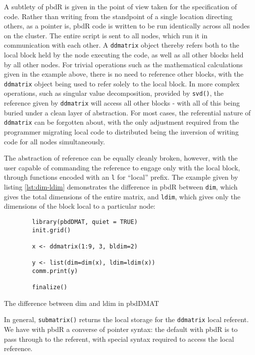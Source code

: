 A subtlety of pbdR is given in the point of view taken for the
specification of code. Rather than writing from the standpoint of a
single location directing others, as a pointer is, pbdR code is written
to be run identically across all nodes on the cluster. The entire script
is sent to all nodes, which run it in communication with each other. A
\texttt{ddmatrix} object thereby refers both to the local block held by
the node executing the code, as well as all other blocks held by all
other nodes. For trivial operations such as the mathematical
calculations given in the example above, there is no need to reference
other blocks, with the \texttt{ddmatrix} object being used to refer
solely to the local block. In more complex operations, such as singular
value decomposition, provided by \texttt{svd()}, the reference given by
\texttt{ddmatrix} will access all other blocks - with all of this being
buried under a clean layer of abstraction. For most cases, the
referential nature of \texttt{ddmatrix} can be forgotten about, with the
only adjustment required from the programmer migrating local code to
distributed being the inversion of writing code for all nodes
simultaneously.

The abstraction of reference can be equally cleanly broken, however,
with the user capable of commanding the reference to engage only with
the local block, through functions encoded with an \texttt{l} for
``local'' prefix. The example given by listing \cref{lst:dim-ldim} demonstrates the difference in
pbdR between \texttt{dim}, which gives the total dimensions of the
entire matrix, and \texttt{ldim}, which gives only the dimensions of the
block local to a particular node:

\begin{listing}
    \begin{verbatim}
        library(pbdDMAT, quiet = TRUE)
        init.grid()
        
        x <- ddmatrix(1:9, 3, bldim=2)
        
        y <- list(dim=dim(x), ldim=ldim(x))
        comm.print(y)
        
        finalize()
    \end{verbatim}
    \caption{The difference between dim and ldim in pbdDMAT}
    \label{lst:dim-ldim}
\end{listing}

In general, \texttt{submatrix()} returns the local storage for the
\texttt{ddmatrix} local referent. We have with pbdR a converse of
pointer syntax: the default with pbdR is to pass through to the
referent, with special syntax required to access the local reference.


